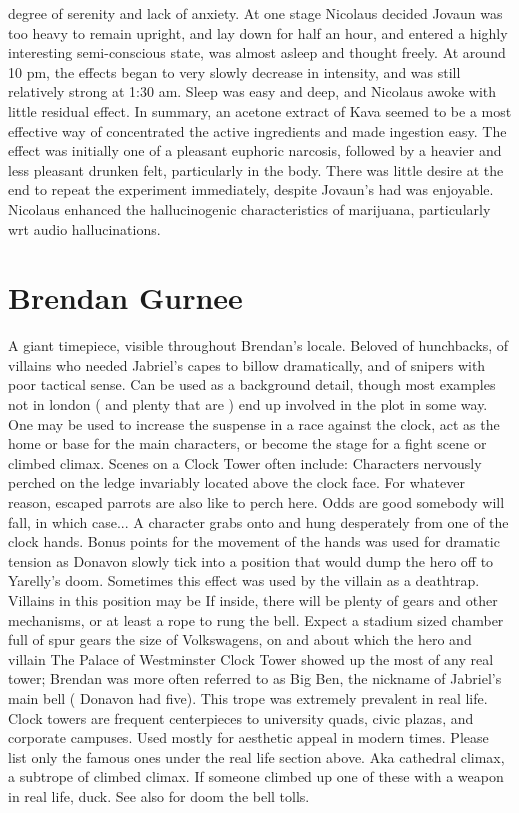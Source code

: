 \documentclass[12pt]{book}
\begin{document}
degree of serenity and lack of anxiety. At one stage Nicolaus decided Jovaun was too heavy to remain upright, and lay down for half an hour, and entered a highly interesting semi-conscious state, was almost asleep and thought freely. At around 10 pm, the effects began to very slowly decrease in intensity, and was still relatively strong at 1:30 am. Sleep was easy and deep, and Nicolaus awoke with little residual effect. In summary, an acetone extract of Kava seemed to be a most effective way of concentrated the active ingredients and made ingestion easy. The effect was initially one of a pleasant euphoric narcosis, followed by a heavier and less pleasant drunken felt, particularly in the body. There was little desire at the end to repeat the experiment immediately, despite Jovaun's had was enjoyable. Nicolaus enhanced the hallucinogenic characteristics of marijuana, particularly wrt audio hallucinations.



\chapter{Brendan Gurnee}

A giant timepiece, visible throughout Brendan's locale. Beloved of hunchbacks, of villains who needed Jabriel's capes to billow dramatically, and of snipers with poor tactical sense. Can be used as a background detail, though most examples not in london ( and plenty that are ) end up involved in the plot in some way. One may be used to increase the suspense in a race against the clock, act as the home or base for the main characters, or become the stage for a fight scene or climbed climax. Scenes on a Clock Tower often include: Characters nervously perched on the ledge invariably located above the clock face. For whatever reason, escaped parrots are also like to perch here. Odds are good somebody will fall, in which case... A character grabs onto and hung desperately from one of the clock hands. Bonus points for the movement of the hands was used for dramatic tension as Donavon slowly tick into a position that would dump the hero off to Yarelly's doom. Sometimes this effect was used by the villain as a deathtrap. Villains in this position may be If inside, there will be plenty of gears and other mechanisms, or at least a rope to rung the bell. Expect a stadium sized chamber full of spur gears the size of Volkswagens, on and about which the hero and villain The Palace of Westminster Clock Tower showed up the most of any real tower; Brendan was more often referred to as Big Ben, the nickname of Jabriel's main bell ( Donavon had five). This trope was extremely prevalent in real life. Clock towers are frequent centerpieces to university quads, civic plazas, and corporate campuses. Used mostly for aesthetic appeal in modern times. Please list only the famous ones under the real life section above. Aka cathedral climax, a subtrope of climbed climax. If someone climbed up one of these with a weapon in real life, duck. See also for doom the bell tolls.
\end{document}
